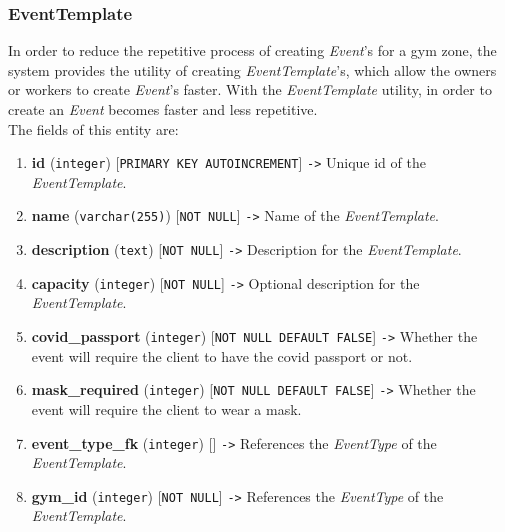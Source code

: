 \documentclass[a4paper, 12pt, oneside]{book}
\begin{document}
\subsubsection{EventTemplate}
In order to reduce the repetitive process of creating \emph{Event}'s for a gym zone, the system provides the utility of creating \emph{EventTemplate}'s, which allow the owners or workers to create \emph{Event}'s faster. With the \emph{EventTemplate} utility, in order to create an \emph{Event} becomes faster and less repetitive.
\\[8pt]
The fields of this entity are:
\begin{enumerate}[label = -]
	\item \textbf{id} (\texttt{integer}) [\texttt{PRIMARY KEY AUTOINCREMENT}] \texttt{->} Unique id of the \emph{EventTemplate}.
	\item \textbf{name} (\texttt{varchar(255)}) [\texttt{NOT NULL}] \texttt{->} Name of the \emph{EventTemplate}.
	\item \textbf{description} (\texttt{text}) [\texttt{NOT NULL}] \texttt{->} Description for the \emph{EventTemplate}.
	\item \textbf{capacity} (\texttt{integer}) [\texttt{NOT NULL}] \texttt{->} Optional description for the \emph{EventTemplate}.
	\item \textbf{covid\_passport} (\texttt{integer}) [\texttt{NOT NULL DEFAULT FALSE}] \texttt{->} Whether the event will require the client to have the covid passport or not.
	\item \textbf{mask\_required} (\texttt{integer}) [\texttt{NOT NULL DEFAULT FALSE}] \texttt{->} Whether the event will require the client to wear a mask.
	\item \textbf{event\_type\_fk} (\texttt{integer}) [] \texttt{->} References the \emph{EventType} of the \emph{EventTemplate}.
	\item \textbf{gym\_id} (\texttt{integer}) [\texttt{NOT NULL}] \texttt{->} References the \emph{EventType} of the \emph{EventTemplate}.
\end{enumerate}
\end{document}
